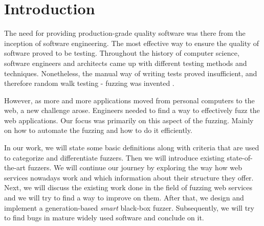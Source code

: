 \chapter{Introduction}
The need for providing production-grade quality software was there from the inception of software engineering. The most effective way to ensure the quality of software proved to be testing. Throughout the history of computer science, software engineers and architects came up with different testing methods and techniques. Nonetheless, the manual way of writing tests proved insufficient, and therefore random walk testing - fuzzing was invented \cite{miller1990empirical}.

However, as more and more applications moved from personal computers to the web, a new challenge arose. Engineers needed to find a way to effectively fuzz the web applications. Our focus was primarily on this aspect of the fuzzing. Mainly on how to automate the fuzzing and how to do it efficiently.

In our work, we will state some basic definitions along with criteria that are used to categorize and differentiate fuzzers. Then we will introduce existing state-of-the-art fuzzers. We will continue our journey by exploring the way how web services nowadays work and which information about their structure they offer. Next, we will discuss the existing work done in the field of fuzzing web services and we will try to find a way to improve on them. After that, we design and implement a generation-based \textit{smart} black-box fuzzer. Subsequently, we will try to find bugs in mature widely used software and conclude on it.
